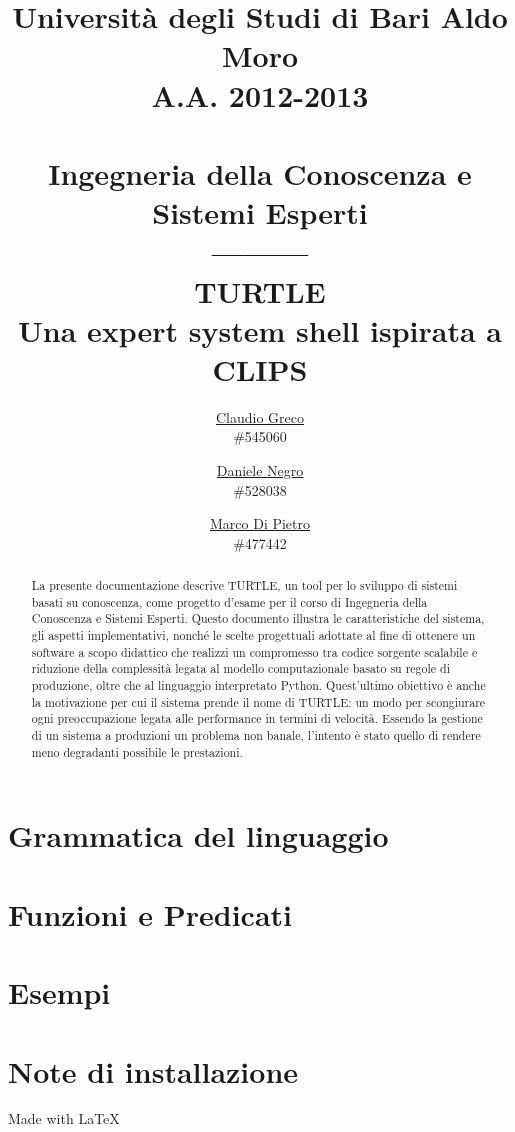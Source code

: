 \documentclass[12pt, a4paper]{report}
\title{
  Università degli Studi di Bari Aldo Moro
  \\A.A. 2012-2013 
  \\~
  \\Ingegneria della Conoscenza e Sistemi Esperti
  \\---------
  \\\textbf{TURTLE}
  \\Una expert system shell ispirata a CLIPS
}
\author{
  \href{mailto:jwein.it@gmail.com}{Claudio Greco}\\
  \#545060
  \and
  \href{mailto:danieleweb1987@gmail.com}{Daniele Negro}\\
  \#528038
  \and
  \href{mailto:dptr.marco@gmail.com}{Marco Di Pietro}\\
  \#477442
}
\begin{document}
\maketitle

\begin{abstract}
La presente documentazione descrive TURTLE, un tool per lo sviluppo di sistemi basati su conoscenza, come progetto d'esame per il corso di Ingegneria della Conoscenza e Sistemi Esperti. Questo documento illustra le caratteristiche del sistema, gli aspetti implementativi, nonché le scelte progettuali adottate al fine di ottenere un software a scopo didattico che realizzi un compromesso tra codice sorgente scalabile e riduzione della complessità legata al modello computazionale basato su regole di produzione, oltre che al linguaggio interpretato Python. Quest'ultimo obiettivo è anche la motivazione per cui il sistema prende il nome di TURTLE: un modo per scongiurare ogni preoccupazione legata alle performance in termini di velocità. Essendo la gestione di un sistema a produzioni un problema non banale, l'intento è stato quello di rendere meno degradanti possibile le prestazioni.
\end{abstract}

\tableofcontents






\begin{appendices}
\chapter{Grammatica del linguaggio}


\chapter{Funzioni e Predicati}



\chapter{Esempi}


\chapter{Note di installazione}


\end{appendices}

\cleardoublepage
{}
{}
\nocite{*}



\begin{flushright}
\vspace{2cm}
Made with \LaTeX{}
\end{flushright}
\end{document}
